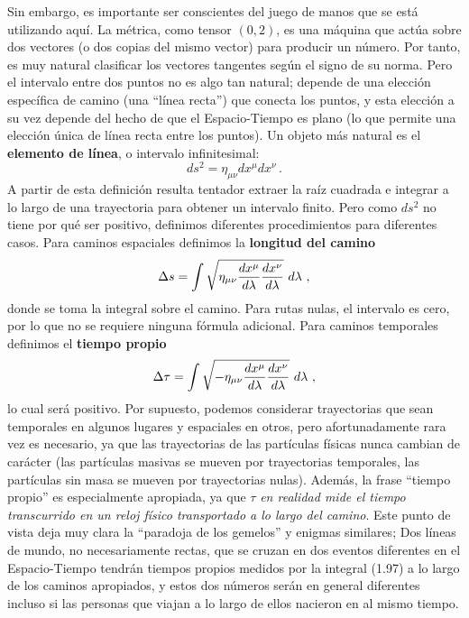 \documentclass[11pt,b5paper,openany,twoside]{book}
\newcommand{\mn}{{\mu\nu}}
\begin{document}
Sin embargo, es importante ser conscientes del juego de manos que se está utilizando aquí.
La métrica, como tensor $(0,2)$, es una máquina que actúa sobre dos vectores (o dos copias del mismo vector) para producir un número.
Por tanto, es muy natural clasificar los vectores tangentes según el signo de su norma.
Pero el intervalo entre dos puntos no es algo tan natural; depende de una elección específica de camino (una ``línea recta'') que conecta los puntos, y esta elección a su vez depende del hecho de que el Espacio-Tiempo es plano (lo que permite una elección única de línea recta entre los puntos).
Un objeto más natural es el {\bf elemento de línea}, o intervalo infinitesimal:
\begin{equation}
ds^2 = \eta_\mn dx^\mu dx^\nu\,.\label{1.95}
\end{equation}
A partir de esta definición resulta tentador extraer la raíz cuadrada e integrar a lo largo de una trayectoria para obtener un intervalo finito.
Pero como $ds^2$ no tiene por qué ser positivo, definimos diferentes procedimientos para diferentes casos.
Para caminos espaciales definimos la {\bf longitud del camino}
\begin{equation}
\Delta s = \int \sqrt{\eta_\mn{{dx^\mu}\over{d\lambda}}
{{dx^\nu}\over{d\lambda}}}\ d\lambda\ ,\label{1.96}
\end{equation}
donde se toma la integral sobre el camino.
Para rutas nulas, el intervalo es cero, por lo que no se requiere ninguna fórmula adicional.
Para caminos temporales definimos el {\bf tiempo propio}
\begin{equation}
\Delta \tau = \int \sqrt{-\eta_\mn{{dx^\mu}\over{d\lambda}}
{{dx^\nu}\over{d\lambda}}}\ d\lambda\ ,\label{1.97}
\end{equation}
lo cual será positivo.
Por supuesto, podemos considerar trayectorias que sean temporales en algunos lugares y espaciales en otros, pero afortunadamente rara vez es necesario, ya que las trayectorias de las partículas físicas nunca cambian de carácter (las partículas masivas se mueven por trayectorias temporales, las partículas sin masa se mueven por trayectorias nulas).
Además, la frase ``tiempo propio'' es especialmente apropiada, ya que $\tau$ \textit{en realidad mide el tiempo transcurrido en un reloj físico transportado a lo largo del camino}.
Este punto de vista deja muy clara la ``paradoja de los gemelos'' y enigmas similares; Dos líneas de mundo, no necesariamente rectas, que se cruzan en dos eventos diferentes en el Espacio-Tiempo tendrán tiempos propios medidos por la integral (1.97) a lo largo de los caminos apropiados, y estos dos números serán en general diferentes incluso si las personas que viajan a lo largo de ellos nacieron en al mismo tiempo.
\end{document}
